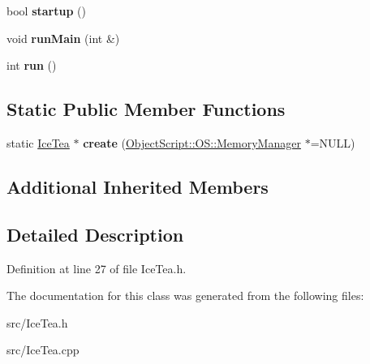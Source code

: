 \begin{DoxyCompactItemize}
\item 
bool {\bfseries startup} ()\hypertarget{class_ice_tea_a98dcfd2b4df264a1fa7f6d0dde478255}{}\label{class_ice_tea_a98dcfd2b4df264a1fa7f6d0dde478255}

\item 
void {\bfseries run\+Main} (int \&)\hypertarget{class_ice_tea_a5dc2c268f58a959881ebdd4ee15cdb2c}{}\label{class_ice_tea_a5dc2c268f58a959881ebdd4ee15cdb2c}

\item 
int {\bfseries run} ()\hypertarget{class_ice_tea_aac2f8964a8f3da984a5cfe6f80fc6210}{}\label{class_ice_tea_aac2f8964a8f3da984a5cfe6f80fc6210}

\end{DoxyCompactItemize}
\subsection*{Static Public Member Functions}
\begin{DoxyCompactItemize}
\item 
static \hyperlink{class_ice_tea}{Ice\+Tea} $\ast$ {\bfseries create} (\hyperlink{class_object_script_1_1_o_s_1_1_memory_manager}{Object\+Script\+::\+O\+S\+::\+Memory\+Manager} $\ast$=N\+U\+LL)\hypertarget{class_ice_tea_a058f69932bb25a49172e9e2b2b92c363}{}\label{class_ice_tea_a058f69932bb25a49172e9e2b2b92c363}

\end{DoxyCompactItemize}
\subsection*{Additional Inherited Members}


\subsection{Detailed Description}


Definition at line 27 of file Ice\+Tea.\+h.



The documentation for this class was generated from the following files\+:\begin{DoxyCompactItemize}
\item 
src/Ice\+Tea.\+h\item 
src/Ice\+Tea.\+cpp\end{DoxyCompactItemize}
